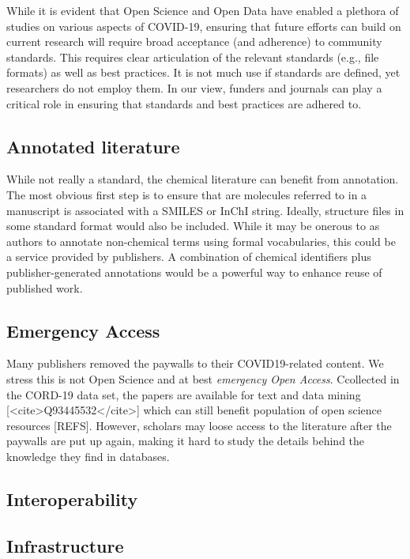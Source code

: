 \documentclass{bmcart}
\begin{document}
While it is evident that Open Science and Open Data have enabled a
plethora of studies on various aspects of COVID-19, ensuring that
future efforts can build on current research will require broad
acceptance (and adherence) to community standards. This requires clear
articulation of the relevant standards (e.g., file formats) as well as
best practices. It is not much use if standards are defined, yet
researchers do not employ them. In our view, funders and journals can
play a critical role in ensuring that standards and best practices are
adhered to.

\subsection*{Annotated literature}

While not really a standard, the chemical literature can benefit from
annotation. The most obvious first step is to ensure that are
molecules referred to in a manuscript is associated with a SMILES or
InChI string. Ideally, structure files in some standard format would
also be included. While it may be onerous to as authors to annotate
non-chemical terms using formal vocabularies, this could be a service
provided by publishers. A combination of chemical identifiers plus
publisher-generated annotations would be a powerful way to enhance
reuse of published work.

\subsection*{Emergency Access}

Many publishers removed the paywalls to their COVID19-related
content. We stress this is not Open Science and at best
\emph{emergency Open Access}. Ccollected in the CORD-19 data set, the
papers are available for text and data mining [<cite>Q93445532</cite>]
which can still benefit population of open science resources
[REFS]. However, scholars may loose access to the literature after the
paywalls are put up again, making it hard to study the details behind
the knowledge they find in databases.


\subsection*{Interoperability}



\subsection*{Infrastructure}
\end{document}
